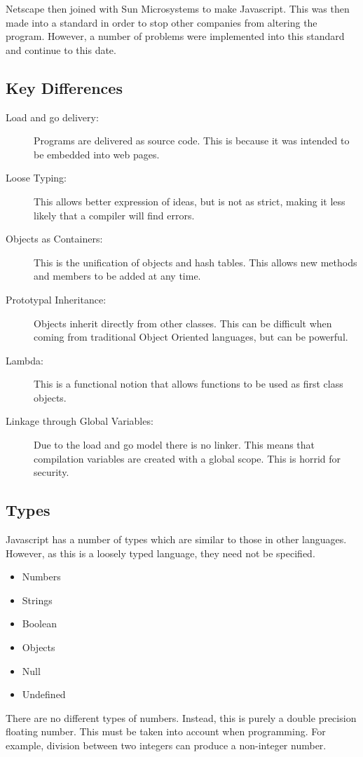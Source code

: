 			Netscape then joined with Sun Microsystems to make Javascript. 
			This was then made into a standard in order to stop other companies from altering the program. 
			However, a number of problems were implemented into this standard and continue to this date. 
		\subsection{Key Differences}
			\begin{description}
				\item[Load and go delivery:] Programs are delivered as source code. 
					This is because it was intended to be embedded into web pages. 
				\item[Loose Typing:] This allows better expression of ideas,
					but is not as strict, making it less likely that a compiler will find errors. 
				\item[Objects as Containers:] This is the unification of objects and hash tables.
					This allows new methods and members to be added at any time. 
				\item[Prototypal Inheritance:] Objects inherit directly from other classes. 
					This can be difficult when coming from traditional Object Oriented languages, but can be powerful. 
				\item[Lambda:] This is a functional notion that allows functions to be used as first class objects. 
				\item[Linkage through Global Variables:] Due to the load and go model there is no linker. 
					This means that compilation variables are created with a global scope. 
					This is horrid for security. 
			\end{description}
		\subsection{Types}
			Javascript has a number of types which are similar to those in other languages. 
			However, as this is a loosely typed language, they need not be specified. 
			\begin{itemize}
				\item Numbers
				\item Strings
				\item Boolean
				\item Objects
				\item Null
				\item Undefined
			\end{itemize}
			There are no different types of numbers. 
			Instead, this is purely a double precision floating number. 
			This must be taken into account when programming. 
			For example, division between two integers can produce a non-integer number. 

